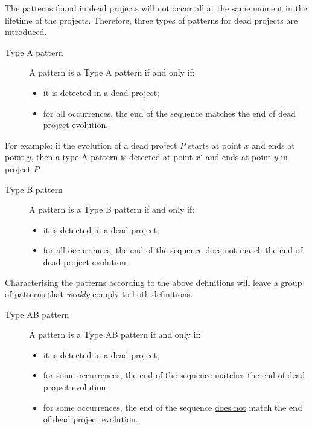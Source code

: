 The patterns found in dead projects will not occur all at the same moment in
the lifetime of the projects. Therefore, three types of patterns for dead
projects are introduced.

\vspace{1em}
\label{def:pattern_typea}
\begin{description}
	\item[Type A pattern]
		A pattern is a Type A pattern if and only if:
		\begin{itemize}
			\item it is detected in a dead project;
			\item for all occurrences, the end of the sequence matches the end
			of dead project evolution.
		\end{itemize}
\end{description}

\vspace{1em}
\noindent
For example: if the evolution of a dead project $P$ starts at point $x$ and ends
at point $y$, then a type A pattern is detected at point $x'$ and ends at point
$y$ in project $P$.

\vspace{1em}
\label{def:pattern_typeb}
\begin{description}
	\item[Type B pattern]
		A pattern is a Type B pattern if and only if:
		\begin{itemize}
			\item it is detected in a dead project;
			\item for all occurrences, the end of the sequence \underline{does not} match
			the end of dead project evolution.
		\end{itemize}
\end{description}

\vspace{1em}
\noindent
Characterising the patterns according to the above definitions will leave a
group of patterns that \textit{weakly} comply to both definitions.

\vspace{1em}
\label{def:pattern_typeab}
\begin{description}
	\item[Type AB pattern]
		A pattern is a Type AB pattern if and only if:
		\begin{itemize}
			\item it is detected in a dead project;
			\item for some occurrences, the end of the sequence matches the end of dead
			project evolution;
			\item for some occurrences, the end of the sequence \underline{does not}
			match the end of dead project evolution.
		\end{itemize}
\end{description}

